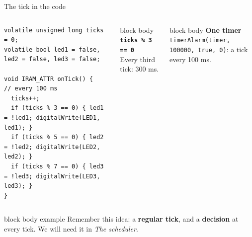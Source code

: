 \documentclass[aspectratio=169,10pt]{beamer}
\newcommand{\stepbox}[2]{%
  \begin{beamercolorbox}[rounded=true,sep=0.09cm,wd=\linewidth]{block body}
    \footnotesize\textbf{#1}\\ #2
  \end{beamercolorbox}\vspace{0.06cm}}
\newcommand{\keymsg}[1]{%
  \begin{beamercolorbox}[rounded=true,sep=0.1cm,wd=\textwidth]{block body example}
    \centering\footnotesize #1
  \end{beamercolorbox}}
\begin{document}
\begin{frame}[fragile]{The tick in the code}
  \begin{columns}[c,onlytextwidth]
\begin{lstlisting}[style=rtos]
volatile unsigned long ticks = 0;
volatile bool led1 = false, led2 = false, led3 = false;

void IRAM_ATTR onTick() {        // every 100 ms
  ticks++;
  if (ticks % 3 == 0) { led1 = !led1; digitalWrite(LED1, led1); }
  if (ticks % 5 == 0) { led2 = !led2; digitalWrite(LED2, led2); }
  if (ticks % 7 == 0) { led3 = !led3; digitalWrite(LED3, led3); }
}
\end{lstlisting}
      \stepbox{\texttt{ticks \% 3 == 0}}{Every third tick: 300 ms.}
      \stepbox{One timer}{\texttt{timerAlarm(timer, 100000, true, 0)}: a tick every 100 ms.}
  \end{columns}
  \vfill
  \keymsg{Remember this idea: a \textbf{regular tick}, and a \textbf{decision} at every tick. We will need it in \emph{The scheduler}.}
\end{frame}
\end{document}
